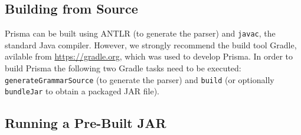 \documentclass{llncs}
\begin{document}
\subsection{Building from Source}
\label{sec:build}

Prisma can be built using ANTLR (to generate the parser) and \texttt{javac}, the standard Java compiler. However, we strongly recommend the build tool Gradle, avilable from \url{https://gradle.org}, which was used to develop Prisma. In order to build Prisma the following two Gradle tasks need to be executed: \texttt{generateGrammarSource} (to generate the parser) and \texttt{build} (or optionally \texttt{bundleJar} to obtain a packaged JAR file).

\subsection{Running a Pre-Built JAR}
\label{sec:runjar}
\end{document}
